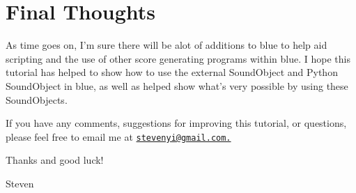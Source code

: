 \section{Final Thoughts}

As time goes on, I'm sure there will be alot of additions to blue to
help aid scripting and the use of other score generating programs within
blue. I hope this tutorial has helped to show how to use the external
SoundObject and Python SoundObject in blue, as well as helped show
what's very possible by using these SoundObjects.

If you have any comments, suggestions for improving this tutorial, or
questions, please feel free to email me at
\href{mailto:stevenyi@gmail.com.}{\nolinkurl{stevenyi@gmail.com.}}

Thanks and good luck!

Steven
